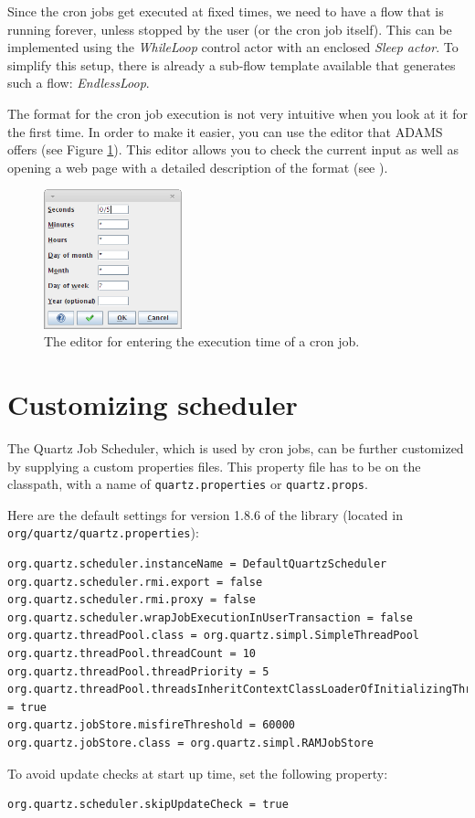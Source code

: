 \documentclass[a4paper]{book}
\begin{document}
Since the cron jobs get executed at fixed times, we need to have a flow that is
running forever, unless stopped by the user (or the cron job itself). This can 
be implemented using the \textit{WhileLoop} control actor with an enclosed 
\textit{Sleep actor}. To simplify this setup, there is already a sub-flow 
template available that generates such a flow: \textit{EndlessLoop}.

The format for the cron job execution is not very intuitive when you look at it
for the first time. In order to make it easier, you can use the editor that ADAMS
offers (see Figure \ref{cron-editor}). This editor allows you to check the
current input as well as opening a web page with a detailed description of
the format (see \cite{cronformat}).

\begin{figure}[htb]
  \centering
  \includegraphics[width=4.0cm]{images/cron-editor.png}
  \caption{The editor for entering the execution time of a cron job.}
  \label{cron-editor}
\end{figure}

\section{Customizing scheduler}
The Quartz Job Scheduler\cite{quartz}, which is used by cron jobs, can be further
customized by supplying a custom properties files. This property file has to be
on the classpath, with a name of \texttt{quartz.properties} or \texttt{quartz.props}.

Here are the default settings for version 1.8.6 of the library (located in
\texttt{org/quartz/quartz.properties}):
\begin{verbatim}
org.quartz.scheduler.instanceName = DefaultQuartzScheduler
org.quartz.scheduler.rmi.export = false
org.quartz.scheduler.rmi.proxy = false
org.quartz.scheduler.wrapJobExecutionInUserTransaction = false
org.quartz.threadPool.class = org.quartz.simpl.SimpleThreadPool
org.quartz.threadPool.threadCount = 10
org.quartz.threadPool.threadPriority = 5
org.quartz.threadPool.threadsInheritContextClassLoaderOfInitializingThread = true
org.quartz.jobStore.misfireThreshold = 60000
org.quartz.jobStore.class = org.quartz.simpl.RAMJobStore
\end{verbatim}
To avoid update checks at start up time, set the following property:
\begin{verbatim}
org.quartz.scheduler.skipUpdateCheck = true
\end{verbatim}
\end{document}
